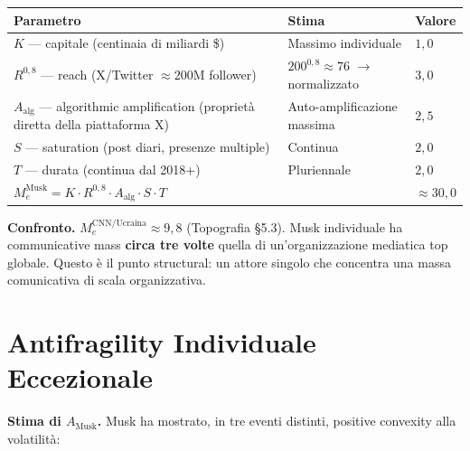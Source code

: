 {\def\LTcaptype{none} %
{\small\begin{longtable}[]{@{}
  >{\raggedright\arraybackslash}p{}
  >{\raggedright\arraybackslash}p{}
  >{\raggedright\arraybackslash}p{}@{}}
\toprule\noalign{}
\begin{minipage}[b]{\linewidth}\raggedright
Parametro
\end{minipage} & \begin{minipage}[b]{\linewidth}\raggedright
Stima
\end{minipage} & \begin{minipage}[b]{\linewidth}\raggedright
Valore
\end{minipage} \\
\midrule\noalign{}
\endhead
\bottomrule\noalign{}
\endlastfoot
\(K\) --- capitale (centinaia di miliardi \$) & Massimo individuale &
\(1{,}0\) \\
\(R^{0{,}8}\) --- reach (X/Twitter \(\approx 200\)M follower) &
\(200^{0{,}8} \approx 76\) $\to$ normalizzato & \(3{,}0\) \\
\(A_{\text{alg}}\) --- algorithmic amplification (proprietà diretta
della piattaforma X) & Auto-amplificazione massima & \(2{,}5\) \\
\(S\) --- saturation (post diari, presenze multiple) & Continua &
\(2{,}0\) \\
\(T\) --- durata (continua dal 2018+) & Pluriennale & \(2{,}0\) \\
\textbf{\(M_e^{\text{Musk}} = K \cdot R^{0{,}8} \cdot A_{\text{alg}} \cdot S \cdot T\)}
& & \textbf{\(\approx 30{,}0\)} \\
\end{longtable}}
}

\Hypoth{} \textbf{Confronto.} \(M_e^{\text{CNN/Ucraina}} \approx 9{,}8\)
(Topografia \S{}5.3). Musk individuale ha communicative mass \textbf{circa
tre volte} quella di un'organizzazione mediatica top globale. Questo è
il punto structural: un attore singolo che concentra una massa
comunicativa di scala organizzativa.



\section{Antifragility Individuale
Eccezionale}\label{antifragilituxe0-individuale-eccezionale}

\Hypoth{} \textbf{Stima di \(A_{\text{Musk}}\).} Musk ha mostrato, in
tre eventi distinti, positive convexity alla volatilità:

